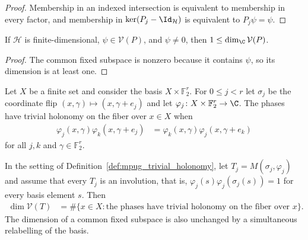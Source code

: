 \begin{proof}\leanok
    Membership in an indexed intersection is equivalent to membership in
    every factor, and membership in $\ker(P_j-\Id_{\mathcal H})$ is equivalent
    to $P_j\psi=\psi$.
\end{proof}

\begin{lemma}
    \label{thm:mpug_common_fixed_subspace_finrank}
    \leanok
    If $\mathcal H$ is finite-dimensional, $\psi\in\mathcal V(P)$, and
    $\psi\neq0$, then $1\leq\dim_{\C}\mathcal V(P)$.
\end{lemma}

\begin{proof}\leanok
    The common fixed subspace is nonzero because it contains $\psi$, so its
    dimension is at least one.
\end{proof}

\begin{definition}
    \label{def:mpug_trivial_holonomy}
    \leanok
    Let $X$ be a finite set and consider the basis $X\times\mathbb F_2^r$.
    For $0\leq j<r$ let $\sigma_j$ be the coordinate flip
    $(x,\gamma)\mapsto(x,\gamma+e_j)$ and let
    $\varphi_j\colon X\times\mathbb F_2^r\to\C$. The phases have trivial
    holonomy on the fiber over $x\in X$ when
    \begin{align}
        \varphi_j(x,\gamma)\varphi_k(x,\gamma+e_j)
         & =\varphi_k(x,\gamma)\varphi_j(x,\gamma+e_k)
        \label{eq:mpug_trivial_holonomy}
    \end{align}
    for all $j,k$ and $\gamma\in\mathbb F_2^r$.
\end{definition}

\begin{lemma}
    \label{thm:mpug_monomial_fixed_space_criterion}
    \leanok
    In the setting of Definition~\ref{def:mpug_trivial_holonomy}, let
    $T_j=M(\sigma_j,\varphi_j)$ and assume that every $T_j$ is an involution,
    that is, $\varphi_j(s)\varphi_j(\sigma_j(s))=1$ for every basis element
    $s$. Then
    \begin{align}
        \dim\mathcal V(T)
         & =\#\{x\in X:\text{the phases have trivial holonomy on the fiber over }x\}.
        \label{eq:mpug_monomial_fixed_space_count}
    \end{align}
    The dimension of a common fixed subspace is also unchanged by a
    simultaneous relabelling of the basis.
\end{lemma}

